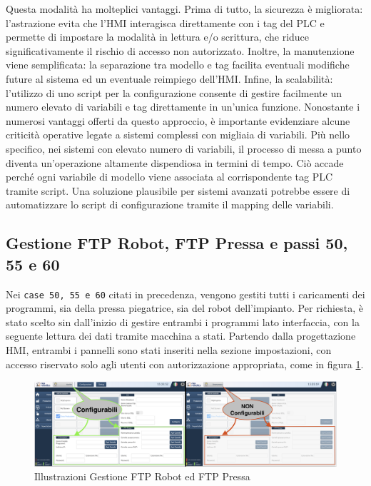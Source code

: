 Questa modalità ha molteplici vantaggi. Prima di tutto, la sicurezza è migliorata: l'astrazione evita che l'HMI interagisca direttamente con i tag del PLC e permette di impostare la modalità in lettura e/o scrittura, che riduce significativamente il rischio di accesso non autorizzato. Inoltre, la manutenzione viene semplificata: la separazione tra modello e tag facilita eventuali modifiche future al sistema ed un eventuale reimpiego dell'HMI. Infine, la scalabilità: l’utilizzo di uno script per la configurazione consente di gestire facilmente un numero elevato di variabili e tag direttamente in un'unica funzione. Nonostante i numerosi vantaggi offerti da questo approccio, è importante evidenziare alcune criticità operative legate a sistemi complessi con migliaia di variabili. Più nello specifico, nei sistemi con elevato numero di variabili, il processo di messa a punto diventa un'operazione altamente dispendiosa in termini di tempo. Ciò accade perché ogni variabile di modello viene associata al corrispondente tag PLC tramite script. Una soluzione plausibile per sistemi avanzati potrebbe essere di automatizzare lo script di configurazione tramite il mapping delle variabili.

\subsection{Gestione FTP Robot, FTP Pressa e passi 50, 55 e 60}
Nei \verb|case 50, 55 e 60| citati in precedenza, vengono gestiti tutti i caricamenti dei programmi, sia della pressa piegatrice, sia del robot dell'impianto. Per richiesta, è stato scelto sin dall'inizio di gestire entrambi i programmi lato interfaccia, con la seguente lettura dei dati tramite macchina a stati. Partendo dalla progettazione HMI, entrambi i pannelli sono stati inseriti nella sezione impostazioni, con accesso riservato solo agli utenti con autorizzazione appropriata, come in figura \ref{fig:FTP.png}.
\begin{figure} [ht]
    \centering
    \includegraphics[width=\linewidth]{Immagini/FTP.png}
    \caption{Illustrazioni Gestione FTP Robot ed FTP Pressa}
    \label{fig:FTP.png}
\end{figure}

